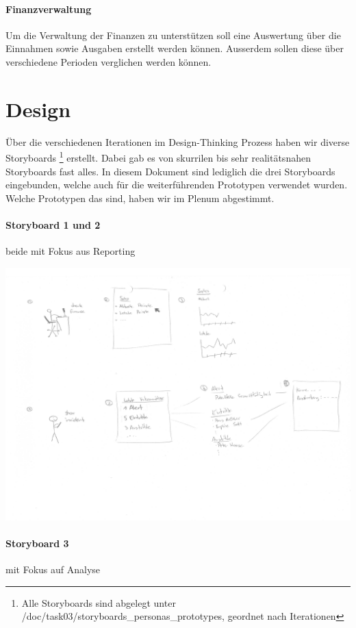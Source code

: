 \documentclass[a4paper]{scrreprt}
\begin{document}
\paragraph{Finanzverwaltung}
Um die Verwaltung der Finanzen zu unterstützen soll eine Auswertung über die Einnahmen sowie Ausgaben erstellt werden können. Ausserdem sollen diese über verschiedene Perioden verglichen werden können.

\pagebreak

\section{Design}
Über die verschiedenen Iterationen im Design-Thinking Prozess haben wir diverse Storyboards \footnote{Alle Storyboards sind  abgelegt unter /doc/task03/storyboards\_personas\_prototypes, geordnet nach Iterationen} erstellt. Dabei gab es von skurrilen bis sehr realitätsnahen Storyboards fast alles. In diesem Dokument sind lediglich die drei Storyboards eingebunden, welche auch für die weiterführenden Prototypen verwendet wurden. Welche Prototypen das sind, haben wir im Plenum abgestimmt.

\paragraph{Storyboard 1 und 2} beide mit Fokus aus Reporting

\includegraphics[width=1\textwidth]{storyboards_personas_prototypes/iteration3/sidlm3_storyboard2+3.png}


\pagebreak

\paragraph{Storyboard 3} mit Fokus auf Analyse
\end{document}
